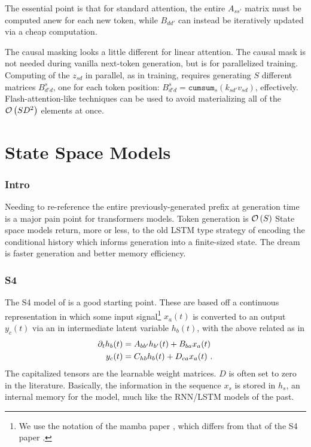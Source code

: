\documentclass[11pt]{article}
\begin{document}
The essential point is that for standard attention, the entire $ A _{s s'} $ matrix must be computed
anew for each new token, while $ B _{ d d' } $ can instead be iteratively updated via a cheap
computation.

The causal masking looks a little different for linear attention. The causal mask is not needed
during vanilla next-token generation, but is for parallelized training. Computing of the $ z _{ sd }
$ in parallel, as in training, requires generating $ S $ different matrices $ B ^{ s }_{  d'd }  $,
one for each token position: $ B ^{ s }_{  d' d } = \texttt{cumsum}_{ s } \left ( k _{ sd' }v _{ sd
} \right ) $, effectively. Flash-attention-like techniques can be used to avoid materializing all of
the $ \mathcal{O} \left( SD ^{ 2 } \right)  $ elements at once.



\newpage
\part{State Space Models}

\section{Intro\label{sec_ssm_intro}}

Needing to re-reference the entire previously-generated prefix at generation time is a major pain
point for transformers models. Token generation is $ \mathcal{O} \left( S \right)  $ State space models
return, more or less, to the old LSTM type strategy of encoding the conditional history which
informs generation into a finite-sized state. The dream is faster generation and better memory
efficiency.


\section{S4 \label{sec_s4}}

The S4 model of \cite{s4} is a good starting point.  These are based off a continuous representation
in which some input signal\footnote{We use the notation of the mamba paper \cite{mamba}, which
differs from that of the S4 paper \cite{s4}.} $ x _{ a }(t) $ is converted to an output $ y _{ c
}(t) $ via an in
intermediate latent variable $ h _{ b }(t) $, with the above related as in
\begin{align}
    \partial _{ t }h _{ b }(t) &= A _{ b b' }h _{ b' }(t) + B _{ b a }x _{ a }(t)\nonumber\\
    y _{ c }(t) &= C _{ h b }h _{ b }(t) + D _{ c a }x _{ a }(t) \label{eq_s4_continuous} \ .
\end{align}
The capitalized tensors are the learnable weight matrices. $ D $ is often set to zero in the
literature. Basically, the information in the sequence $ x _{ s }  $ is stored in $ h _{ s }  $, an
internal memory for the model, much like the RNN/LSTM models of the past.
\end{document}
